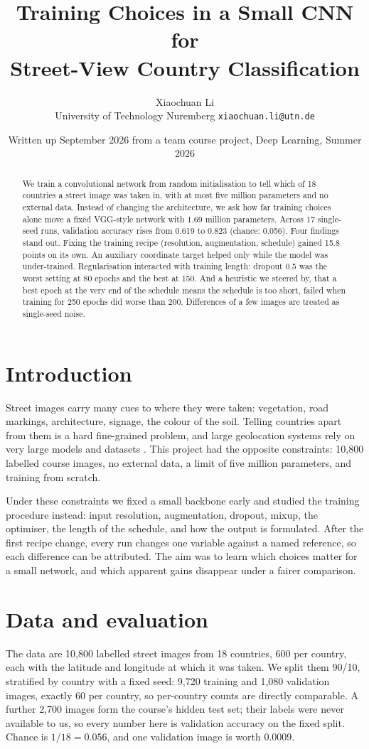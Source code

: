 \documentclass[11pt,a4paper]{article}
\title{\vspace{-1.2em}\textbf{Training Choices in a Small CNN for\\Street-View Country Classification}}
\author{Xiaochuan Li\\[0.2em]\small University of Technology Nuremberg \quad \texttt{xiaochuan.li@utn.de}}
\date{\small Written up September 2026 from a team course project, Deep Learning, Summer 2026}
\begin{document}
\maketitle

\begin{abstract}
\noindent
We train a convolutional network from random initialisation to tell which of 18 countries a street image was taken in, with at most five million parameters and no external data. Instead of changing the architecture, we ask how far training choices alone move a fixed VGG-style network with 1.69 million parameters. Across 17 single-seed runs, validation accuracy rises from 0.619 to 0.823 (chance: 0.056). Four findings stand out. Fixing the training recipe (resolution, augmentation, schedule) gained 15.8 points on its own. An auxiliary coordinate target helped only while the model was under-trained. Regularisation interacted with training length: dropout 0.5 was the worst setting at 80 epochs and the best at 150. And a heuristic we steered by, that a best epoch at the very end of the schedule means the schedule is too short, failed when training for 250 epochs did worse than 200. Differences of a few images are treated as single-seed noise.
\end{abstract}

\section{Introduction}
Street images carry many cues to where they were taken: vegetation, road markings, architecture, signage, the colour of the soil. Telling countries apart from them is a hard fine-grained problem, and large geolocation systems rely on very large models and datasets \citep{planet}. This project had the opposite constraints: 10,800 labelled course images, no external data, a limit of five million parameters, and training from scratch.

Under these constraints we fixed a small backbone early and studied the training procedure instead: input resolution, augmentation, dropout, mixup, the optimiser, the length of the schedule, and how the output is formulated. After the first recipe change, every run changes one variable against a named reference, so each difference can be attributed. The aim was to learn which choices matter for a small network, and which apparent gains disappear under a fairer comparison.

\section{Data and evaluation}
The data are 10,800 labelled street images from 18 countries, 600 per country, each with the latitude and longitude at which it was taken. We split them 90/10, stratified by country with a fixed seed: 9,720 training and 1,080 validation images, exactly 60 per country, so per-country counts are directly comparable. A further 2,700 images form the course's hidden test set; their labels were never available to us, so every number here is validation accuracy on the fixed split. Chance is $1/18 = 0.056$, and one validation image is worth 0.0009.
\end{document}
